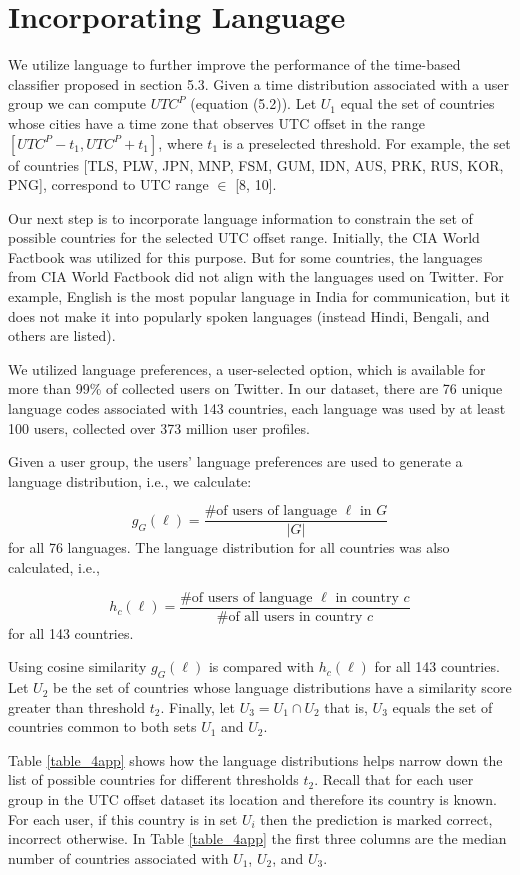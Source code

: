 \section{Incorporating Language} 
We utilize language to further improve the performance of the time-based classifier proposed in section 5.3. Given a time distribution associated with a user group we can compute $UTC^P$ (equation (5.2)). Let $U_1$ equal the set of countries whose cities have a time zone that observes UTC offset in the range $[UTC^P-t_1 , UTC^P + t_1]$, where $t_1$ is a preselected threshold.  For example,  the set of countries [TLS, PLW, JPN, MNP, FSM, GUM, IDN, AUS, PRK, RUS, KOR, PNG], correspond to UTC range $\in$ [8, 10].

Our next step is to incorporate language information to constrain the set of possible countries for the selected UTC offset range. Initially, the CIA World Factbook was utilized for this purpose. But for some countries, the languages from CIA World Factbook did not align with the languages used on Twitter. For example, English is the most popular language in India for communication, but it does not make it into popularly spoken languages (instead Hindi, Bengali, and others are listed).

We utilized language preferences, a user-selected option, which is available for more than 99\% of collected users on Twitter. In our dataset, there are 76 unique language codes associated with 143 countries, each language was used by at least 100 users, collected over 373 million user profiles. 

Given a user group, the users' language preferences are used to generate a language distribution, i.e., we calculate:

\[ g_G(\ell) = \frac{\text{\# of users of language } \ell \text{ in } G}{|G|}\]
for all 76 languages. The language distribution for all countries was also calculated, i.e.,

\[ h_c(\ell) = \frac{\text{\# of users of language } \ell \text{ in country } c}{\text{\# of all users in country } c}\]
for all 143 countries.

Using cosine similarity  $g_G(\ell)$ is compared with  $h_c(\ell)$ for all 143 countries. Let $U_2$ be the set of countries whose language distributions have a similarity score greater than threshold $t_2$. Finally, let $U_3 = U_1 \cap U_2$ that is, $U_3$ equals the set of countries common to both sets $U_1$ and $U_2$.

Table \ref{table_4app} shows how the language distributions helps narrow down the list of possible countries for different thresholds $t_2$. Recall that for each user group in the UTC offset dataset its location and therefore its country is known. For each user, if this country is in set $U_i$ then the prediction is marked correct, incorrect otherwise. In Table \ref{table_4app} the first three columns are the median number of countries associated with $U_1$, $U_2$, and $U_3$. 

